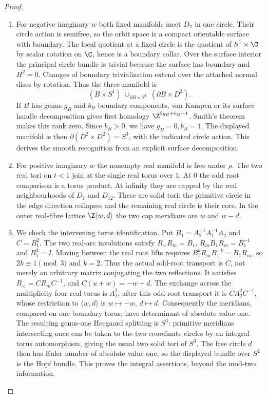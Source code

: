 \begin{proof}
\begin{enumerate}[label=\arabic*.,leftmargin=*]
\item For negative imaginary $w$ both fixed manifolds meet $D_2$ in one circle.
Their circle action is semifree, so the orbit space is a compact
orientable surface with boundary. The local quotient at a fixed circle
is the quotient of $S^1\times\C$ by scalar rotation on $\C$, hence is
a boundary collar. Over the surface interior the principal circle bundle
is trivial because the surface has boundary and $H^2=0$. Changes of
boundary trivialization extend over the attached normal discs by
rotation. Thus the three-manifold is
\[
 (B\times S^1)\ \cup_{\partial B\times S^1}\ (\partial B\times D^2).
\]
If $B$ has genus $g_B$ and $b_B$ boundary components, van Kampen or its
surface handle decomposition gives first homology
$\Z^{2g_B+b_B-1}$. Smith's theorem makes this rank zero. Since $b_B>0$,
we have $g_B=0,b_B=1$. The displayed manifold is then
$\partial(D^2\times D^2)=S^3$, with the indicated circle action. This
derives the smooth recognition from an explicit surface decomposition.

\item For positive imaginary $w$ the nonempty real manifold is free under
$\rho$. The two real tori on $t<1$ join at the single real torus over
$1$. At $0$ the odd root comparison is a torus product. At infinity
they are capped by the real neighbourhoods of $D_1$ and $D_{12}$.
These are solid tori: the primitive circle in the edge direction
collapses and the remaining real circle is their core. In the outer
real-fibre lattice $\Z\langle w,d\rangle$ the two cap meridians are
$w$ and $w-d$.

\item We check the intervening torus identification. Put
$B_1=A_2^{-1}A_1^{-1}A_2$ and $C=B_1^2$. The two real-arc involutions
satisfy $R_<R_m=B_1$, $R_mB_1R_m=B_1^{-1}$ and $B_1^3=I$.
Moving between the real root lifts requires
$B_1^kR_mB_1^{-k}=B_1R_m$, so $2k\equiv1\pmod3$ and $k=2$.
Thus the actual odd-root transport is $C$, not merely an arbitrary
matrix conjugating the two reflections. It satisfies $R_<=CR_mC^{-1}$, and
$C(u+w)=-w+d$. The exchange across the multiplicity-four real torus
is $A_2^2$; after this odd-root transport it is
$CA_2^2C^{-1}$, whose restriction to $\langle w,d\rangle$ is
$w\mapsto-w$, $d\mapsto d$. Consequently the meridians, compared on
one boundary torus, have determinant of absolute value one. The
resulting genus-one Heegaard splitting is $S^3$: primitive meridians
intersecting once can be taken to the two coordinate circles by an
integral torus automorphism, giving the usual two solid tori of $S^3$.
The free circle $d$ then has Euler number of absolute value one, so
the displayed bundle over $S^2$ is the Hopf bundle. This proves the
integral assertions, beyond the mod-two information.
\end{enumerate}
\end{proof}

